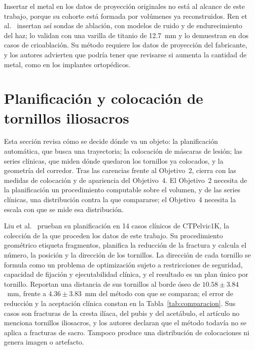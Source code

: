Insertar el metal en los datos de proyección originales no está al alcance de este trabajo, porque su cohorte está formada por volúmenes ya reconstruidos. Ren et al.~\cite{ren2022metalinsertion} insertan así sondas de ablación, con modelos de ruido y de endurecimiento del haz; lo validan con una varilla de titanio de 12.7~mm y lo demuestran en dos casos de crioablación. Su método requiere los datos de proyección del fabricante, y los autores advierten que podría tener que revisarse si aumenta la cantidad de metal, como en los implantes ortopédicos.

\section{Planificación y colocación de tornillos iliosacros}\label{sec:ea-colocacion}

Esta sección revisa cómo se decide dónde va un objeto: la planificación automática, que busca una trayectoria; la colocación de máscaras de lesión; las series clínicas, que miden dónde quedaron los tornillos ya colocados, y la geometría del corredor. Tras las carencias frente al Objetivo~2, cierra con las medidas de colocación y de apariencia del Objetivo~4. El Objetivo~2 necesita de la planificación un procedimiento computable sobre el volumen, y de las series clínicas, una distribución contra la que compararse; el Objetivo~4 necesita la escala con que se mide esa distribución.

Liu et al.~\cite{liu2025pipeline} prueban su planificación en 14 casos clínicos de CTPelvic1K, la colección de la que proceden los datos de este trabajo. Su procedimiento geométrico etiqueta fragmentos, planifica la reducción de la fractura y calcula el número, la posición y la dirección de los tornillos. La dirección de cada tornillo se formula como un problema de optimización sujeto a restricciones de seguridad, capacidad de fijación y ejecutabilidad clínica, y el resultado es un plan único por tornillo. Reportan una distancia de sus tornillos al borde óseo de $10.58 \pm 3.84$~mm, frente a $4.36 \pm 3.83$~mm del método con que se comparan; el error de reducción y la aceptación clínica constan en la Tabla~\ref{tab:comparacion}. Sus casos son fracturas de la cresta ilíaca, del pubis y del acetábulo, el artículo no menciona tornillos iliosacros, y los autores declaran que el método todavía no se aplica a fracturas de sacro. Tampoco produce una distribución de colocaciones ni genera imagen o artefacto.

